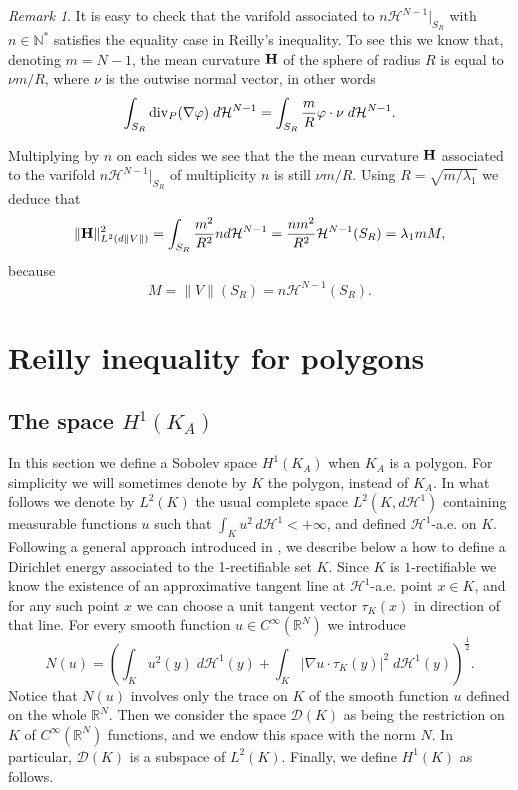 \documentclass[12pt,english]{smfart} %
\theoremstyle{remark}
\newtheorem{remark}[theorem]{Remark}
\newcommand{\R}{\mathbb{R}}
\newcommand{\N}{\mathbb{N}} %
\begin{document}
\begin{remark} It is easy to check that  the varifold   associated to $n\mathcal{H}^{N-1}|_{S_R}$ with $n \in \N^*$ satisfies the equality case in Reilly's inequality. To see this we know that, denoting $m=N-1$, the mean curvature  $\bf H$ of the sphere of radius $R$ is equal to $ \nu m/R$, where $\nu$ is the outwise normal vector, in other words
$$\int_{S_R}  {\rm div}_P(\nabla \varphi) \;d\mathcal{H}^{N-1} = \int_{S_R} \frac{m}{R} \varphi \cdot \nu \; d\mathcal H^{N-1} .$$

Multiplying by $n$ on each sides we see that  the the mean curvature $\bf H$ associated to the varifold $n\mathcal{H}^{N-1}|_{S_R}$ of multiplicity $n$ is still $ \nu m/R$. Using $R=\sqrt{m/\lambda_1}$ we deduce that 
$$\|{\bf H}\|_{L^2(d\|V\|)}^2 = \int_{S_R} \frac{m^2}{R^2} nd \mathcal{H}^{N-1}=\frac{nm^2}{R^2} \mathcal{H}^{N-1}(S_R)=\lambda_1 mM,$$
because 
$$M=\|V\|(S_R)=n \mathcal{H}^{N-1}(S_R).$$
\end{remark}
   
 \section{Reilly inequality for polygons}
\label{polygonSection}
 \subsection{The space $H^1(K_A)$}
 
 In this section  we define a Sobolev space $H^1(K_A)$ when $K_A$ is a polygon. For simplicity we will  sometimes denote by $K$ the polygon, instead of $K_A$.  In what follows we denote by $L^2(K)$ the usual complete space  $L^2(K,d\mathcal{H}^1)$ containing measurable functions $u$ such that $\int_{K} u^2 \, d\mathcal{H}^1<+\infty$, and defined $\mathcal{H}^1$-a.e.\! on $K$. Following a general approach introduced in \cite{zombie}, we describe below a how to define a Dirichlet energy associated to the 1-rectifiable set $K$. Since $K$ is $1$-rectifiable we know the existence of  an approximative tangent line at $\mathcal{H}^1$-a.e.\! point $x\in K$, and  for any such point $x$ we can choose a unit tangent vector $\tau_K(x)$ in direction of that line. For every smooth function $u \in C^\infty(\R^N)$ we introduce 
$$N(u)=\left(\int_{K} u^2(y) \; d\mathcal{H}^1(y) + \int_{K} |\nabla u \cdot \tau_K(y)|^2 \; d\mathcal{H}^1(y)\right)^\frac{1}{2}.$$
Notice that $N(u)$ involves only the trace on $K$ of the smooth function $u$ defined on the whole $\R^N$. Then we consider the space $\mathcal{D}(K)$ as being the restriction on $K$ of  $C^\infty(\R^N)$ functions, and we endow this space with the norm  $N$. In particular,  $\mathcal{D}(K)$  is a subspace of $L^2(K)$.  Finally, we define $H^1(K)$ as follows. 
\end{document}
